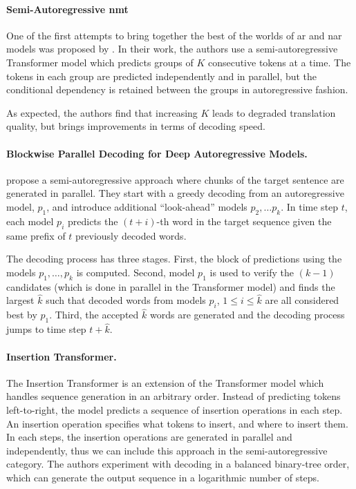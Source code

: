 \paragraph{Semi-Autoregressive \acs{nmt}} One of the first attempts to bring
together the best of the worlds of \ac{ar} and \ac{nar} models was proposed by
\citet{wang-etal-2018-semi}. In their work, the authors use a
semi-autoregressive Transformer model which predicts groups of $K$ consecutive
tokens at a time. The tokens in each group are predicted independently and in
parallel, but the conditional dependency is retained between the groups in
autoregressive fashion.

As expected, the authors find that increasing $K$ leads to degraded translation
quality, but brings improvements in terms of decoding speed.


\paragraph{Blockwise Parallel Decoding for Deep Autoregressive Models.}
\citet{stern2018blockwise} propose a semi-autoregressive approach where chunks
of the target sentence are generated in parallel.
%
They start with a greedy decoding from an autoregressive model, $p_1$, and
introduce additional ``look-ahead'' models $p_2, \ldots p_k$. In time step $t$,
each model $p_i$ predicts the $(t + i)$-th word in the target sequence given the
same prefix of $t$ previously decoded words.

The decoding process has three stages. First, the block of predictions using the
models $p_1, \ldots, p_k$ is computed. Second, model $p_1$ is used to verify the
$(k-1)$ candidates (which is done in parallel in the Transformer model) and
finds the largest $\hat{k}$ such that decoded words from models $p_i$,
$1 \leq i \leq \hat{k}$ are all considered best by $p_1$. Third, the accepted
$\hat{k}$ words are generated and the decoding process jumps to time step
$t + \hat{k}$.

\paragraph{Insertion Transformer.} The Insertion Transformer
\citep{stern-etal-2019-insertion} is an extension of the Transformer model
which handles sequence generation in an arbitrary order. Instead of predicting
tokens left-to-right, the model predicts a sequence of insertion operations in
each step. An insertion operation specifies what tokens to insert, and where to
insert them. In each steps, the insertion operations are generated in parallel
and independently, thus we can include this approach in the semi-autoregressive
category. The authors experiment with decoding in a balanced binary-tree order,
which can generate the output sequence in a logarithmic number of steps.

